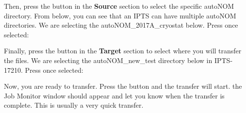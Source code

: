   
Then, press the  button in the \textbf{Source} section to select the specific autoNOM directory. From below, you can see that an IPTS can have multiple autoNOM directories. We are selecting the autoNOM\_2017A\_cryostat below. Press  once selected:

  \noindent{}
  
Finally, press the  button in the \textbf{Target} section to select where you will transfer the files. We are selecting the autoNOM\_new\_test directory below in IPTS-17210. Press  once selected:

  \noindent{}
  
Now, you are ready to transfer. Press the  button and the transfer will start. the Job Monitor window should appear and let you know when the transfer is complete. This is usually a very quick transfer. 

  \noindent{}